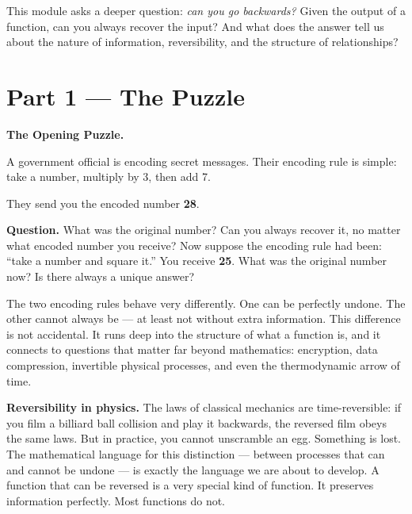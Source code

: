 \documentclass[12pt, a4paper]{article}
\begin{document}
\medskip
This module asks a deeper question: \textit{can you go backwards?} Given the output of a function, can you always recover the input? And what does the answer tell us about the nature of information, reversibility, and the structure of relationships?

\newpage

\section{Part 1 \texorpdfstring{---}{--} The Puzzle}

\begin{puzzlebox}
\textbf{The Opening Puzzle.}

A government official is encoding secret messages. Their encoding rule is simple: take a number, multiply by 3, then add 7.

\medskip
They send you the encoded number \textbf{28}.

\medskip
\textbf{Question.} What was the original number? Can you always recover it, no matter what encoded number you receive? Now suppose the encoding rule had been: ``take a number and square it.'' You receive \textbf{25}. What was the original number now? Is there always a unique answer?
\end{puzzlebox}

\medskip
The two encoding rules behave very differently. One can be perfectly undone. The other cannot always be --- at least not without extra information. This difference is not accidental. It runs deep into the structure of what a function is, and it connects to questions that matter far beyond mathematics: encryption, data compression, invertible physical processes, and even the thermodynamic arrow of time.

\begin{thought}
\textbf{Reversibility in physics.}
The laws of classical mechanics are time-reversible: if you film a billiard ball collision and play it backwards, the reversed film obeys the same laws. But in practice, you cannot unscramble an egg. Something is lost. The mathematical language for this distinction --- between processes that can and cannot be undone --- is exactly the language we are about to develop. A function that can be reversed is a very special kind of function. It preserves information perfectly. Most functions do not.
\end{thought}
\end{document}
